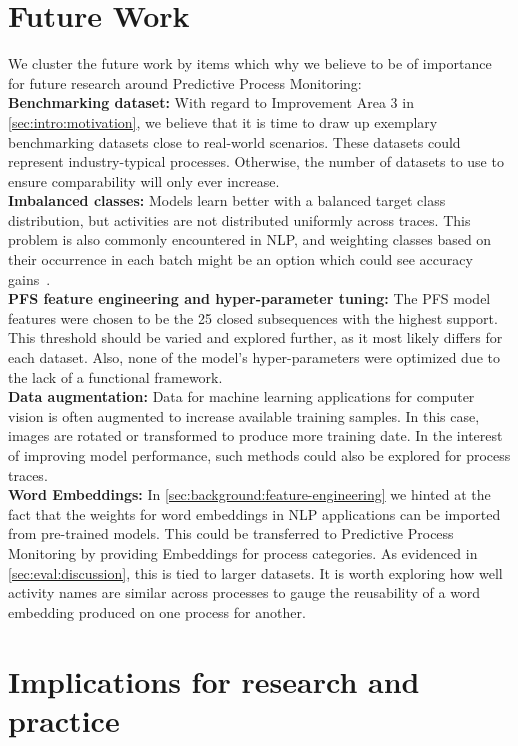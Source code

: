 \section{Future Work} \label{sec:conclusion:future-work}
We cluster the future work by items which why we believe to be of importance for future research around Predictive Process Monitoring:\\

\noindent\textbf{Benchmarking dataset:} With regard to Improvement Area 3 in \autoref{sec:intro:motivation}, we believe that it is time to draw up exemplary benchmarking datasets close to real-world scenarios. These datasets could represent industry-typical processes. Otherwise, the number of datasets to use to ensure comparability will only ever increase.\\

\noindent\textbf{Imbalanced classes:} Models learn better with a balanced target class distribution, but activities are not distributed uniformly across traces. This problem is also commonly encountered in NLP, and weighting classes based on their occurrence in each batch might be an option which could see accuracy gains~\cite{web:stackoverflow-keras-class-weights}.\\

\noindent\textbf{PFS feature engineering and hyper-parameter tuning:} The PFS model features were chosen to be the 25 closed subsequences with the highest support. This threshold should be varied and explored further, as it most likely differs for each dataset. Also, none of the model's hyper-parameters were optimized due to the lack of a functional framework.\\

\noindent\textbf{Data augmentation:} Data for machine learning applications for computer vision is often augmented to increase available training samples. In this case, images are rotated or transformed to produce more training date. In the interest of improving model performance, such methods could also be explored for process traces.\\

\noindent\textbf{Word Embeddings:} In \autoref{sec:background:feature-engineering} we hinted at the fact that the weights for word embeddings in NLP applications can be imported from pre-trained models. This could be transferred to Predictive Process Monitoring by providing Embeddings for process categories. As evidenced in \autoref{sec:eval:discussion}, this is tied to larger datasets. It is worth exploring how well activity names are similar across processes to gauge the reusability of a word embedding produced on one process for another.

\section{Implications for research and practice}

